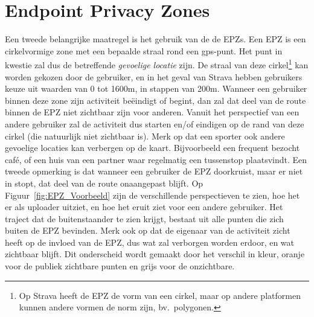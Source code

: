 \section{Endpoint Privacy Zones}\label{sec:EPZ}
Een tweede belangrijke maatregel is het gebruik van de de \acp{EPZ}. Een
\ac{EPZ} is een cirkelvormige zone met een bepaalde straal rond een
\ac{gps}-punt. Het punt in kwestie zal dus de betreffende \textit{gevoelige
    locatie} zijn. De straal van deze cirkel\footnote{Op Strava heeft de \ac{EPZ}
    de vorm van een cirkel, maar op andere platformen kunnen andere vormen de norm
    zijn, bv.\ polygonen.} kan worden gekozen door de gebruiker, en in het geval
van Strava hebben gebruikers keuze uit waarden van 0 tot 1600m, in stappen van
200m. Wanneer een gebruiker binnen deze zone zijn activiteit beëindigt of
begint, dan zal dat deel van de route binnen de \ac{EPZ} niet zichtbaar zijn
voor anderen. Vanuit het perspectief van een andere gebruiker zal de activiteit
dus starten en/of eindigen op de rand van deze cirkel (die natuurlijk niet
zichtbaar is). Merk op dat een sporter ook andere gevoelige locaties kan
verbergen op de kaart. Bijvoorbeeld een frequent bezocht café, of een huis van
een partner waar regelmatig een tussenstop plaatsvindt. Een tweede opmerking is
dat wanneer een gebruiker de \ac{EPZ} doorkruist, maar er niet in stopt, dat
deel van de route onaangepast blijft. Op Figuur~\ref{fig:EPZ_Voorbeeld} zijn de
verschillende perspectieven te zien, hoe het er als uploader uitziet, en hoe
het eruit ziet voor een andere gebruiker. Het traject dat de buitenstaander te
zien krijgt, bestaat uit alle punten die zich buiten de \ac{EPZ} bevinden. Merk
ook op dat de eigenaar van de activiteit zicht heeft op de invloed van de
\ac{EPZ}, dus wat zal verborgen worden erdoor, en wat zichtbaar blijft. Dit
onderscheid wordt gemaakt door het verschil in kleur, oranje voor de publiek
zichtbare punten en grijs voor de onzichtbare.
